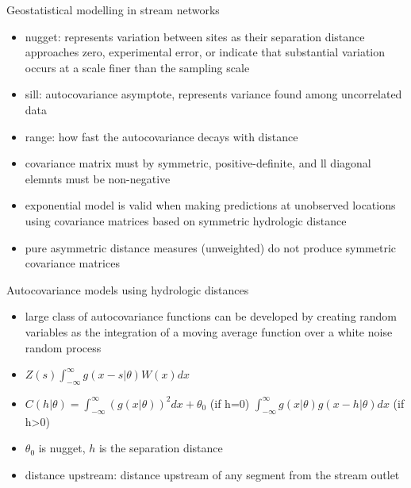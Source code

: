 \documentclass[12pt]{amsart}
\begin{document}
Geostatistical modelling in stream networks
\begin{itemize}
\item nugget: represents variation between sites as their separation distance approaches zero, experimental error, or indicate that substantial variation occurs at a scale finer than the sampling scale
\item sill: autocovariance asymptote, represents variance found among uncorrelated data
\item range: how fast the autocovariance decays with distance
\item covariance matrix must by symmetric, positive-definite, and ll diagonal elemnts must be non-negative
\item exponential model is valid when making predictions at unobserved locations using covariance matrices based on symmetric hydrologic distance
\item pure asymmetric distance measures (unweighted) do not produce symmetric covariance matrices
\end{itemize}

Autocovariance models using hydrologic distances
\begin{itemize}
\item large class of autocovariance functions can be developed by creating random variables as the integration of a moving average function over a white noise random process
\item $Z(s) \int_{-\infty}^\infty g(x-s|\theta)W(x)dx$
\item $C(h|\theta)=  \int_{-\infty}^\infty (g(x|\theta))^2dx+\theta_0$ (if h=0) $\int_{-\infty}^\infty g(x|\theta)g(x-h|\theta)dx$ (if h>0)
\item $\theta_0$ is nugget, $h$ is the separation distance
\item distance upstream: distance upstream of any segment from the stream outlet
\end{itemize}
\end{document}
